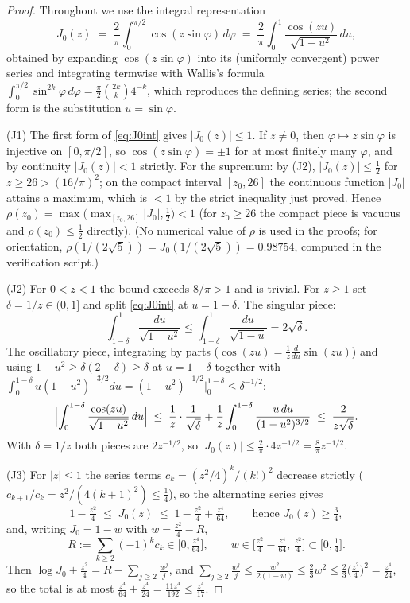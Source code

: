\begin{proof}
Throughout we use the integral representation
\begin{equation}\label{eq:J0int}
J_0(z)\;=\;\frac2\pi\int_0^{\pi/2}\cos(z\sin\varphi)\,d\varphi
\;=\;\frac2\pi\int_0^1\frac{\cos(zu)}{\sqrt{1-u^2}}\,du ,
\end{equation}
obtained by expanding $\cos(z\sin\varphi)$ into its (uniformly
convergent) power series and integrating termwise with Wallis's
formula $\int_0^{\pi/2}\sin^{2k}\varphi\,d\varphi
=\tfrac\pi2\binom{2k}{k}4^{-k}$, which reproduces the defining series;
the second form is the substitution $u=\sin\varphi$.

(J1) The first form of \eqref{eq:J0int} gives $|J_0(z)|\le1$. If
$z\ne0$, then $\varphi\mapsto z\sin\varphi$ is injective on
$[0,\pi/2]$, so $\cos(z\sin\varphi)=\pm1$ for at most finitely many
$\varphi$, and by continuity $|J_0(z)|<1$ strictly. For the supremum:
by (J2), $|J_0(z)|\le\tfrac12$ for $z\ge26>(16/\pi)^2$; on the compact
interval $[z_0,26]$ the continuous function $|J_0|$ attains a maximum,
which is $<1$ by the strict inequality just proved. Hence
$\rho(z_0)=\max\bigl(\max_{[z_0,26]}|J_0|,\tfrac12\bigr)<1$ (for
$z_0\ge26$ the compact piece is vacuous and $\rho(z_0)\le\tfrac12$
directly). (No
numerical value of $\rho$ is used in the proofs; for orientation,
$\rho(1/(2\sqrt5))=J_0(1/(2\sqrt5))=0.98754$, computed in the
verification script.)

(J2) For $0<z<1$ the bound exceeds $8/\pi>1$ and is trivial. For
$z\ge1$ set $\delta=1/z\in(0,1]$ and split \eqref{eq:J0int} at
$u=1-\delta$. The singular piece:
\[
\int_{1-\delta}^1\frac{du}{\sqrt{1-u^2}}
\le\int_{1-\delta}^1\frac{du}{\sqrt{1-u}}=2\sqrt\delta .
\]
The oscillatory piece, integrating by parts
($\cos(zu)=\tfrac1z\frac{d}{du}\sin(zu)$) and using
$1-u^2\ge\delta(2-\delta)\ge\delta$ at $u=1-\delta$ together with
$\int_0^{1-\delta}u(1-u^2)^{-3/2}du=(1-u^2)^{-1/2}\big|_0^{1-\delta}
\le\delta^{-1/2}$:
\[
\Bigl|\int_0^{1-\delta}\frac{\cos(zu)}{\sqrt{1-u^2}}\,du\Bigr|
\;\le\;\frac1z\cdot\frac1{\sqrt\delta}
+\frac1z\int_0^{1-\delta}\frac{u\,du}{(1-u^2)^{3/2}}
\;\le\;\frac2{z\sqrt\delta} .
\]
With $\delta=1/z$ both pieces are $2z^{-1/2}$, so
$|J_0(z)|\le\tfrac2\pi\cdot4z^{-1/2}=\tfrac8\pi z^{-1/2}$.

(J3) For $|z|\le1$ the series terms $c_k=(z^2/4)^k/(k!)^2$ decrease
strictly ($c_{k+1}/c_k=z^2/(4(k+1)^2)\le\tfrac14$), so the alternating
series gives
\[
1-\tfrac{z^2}4\;\le\;J_0(z)\;\le\;1-\tfrac{z^2}4+\tfrac{z^4}{64},
\qquad\text{hence } J_0(z)\ge\tfrac34,
\]
and, writing $J_0=1-w$ with $w=\tfrac{z^2}4-R$,
\[
R:=\sum_{k\ge2}(-1)^kc_k\in\bigl[0,\tfrac{z^4}{64}\bigr],
\qquad
w\in\bigl[\tfrac{z^2}4-\tfrac{z^4}{64},\,\tfrac{z^2}4\bigr]
\subset\bigl[0,\tfrac14\bigr].
\]
Then $\log J_0+\tfrac{z^2}4=R-\sum_{j\ge2}\tfrac{w^j}j$, and
$\sum_{j\ge2}\tfrac{w^j}j\le\tfrac{w^2}{2(1-w)}\le\tfrac23w^2
\le\tfrac23\bigl(\tfrac{z^2}4\bigr)^2=\tfrac{z^4}{24}$, so the total
is at most $\tfrac{z^4}{64}+\tfrac{z^4}{24}=\tfrac{11z^4}{192}
\le\tfrac{z^4}{17}$.


\end{proof}
